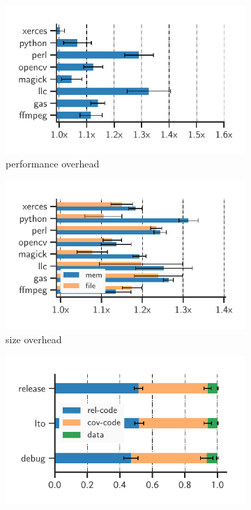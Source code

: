 \begin{figure}[t!]
	\centering
	\small
	\begin{subfigure}[t]{0.29\textwidth}
		\includegraphics[clip, trim=0.48cm 0.4cm 1.4cm 0.65cm, width=\textwidth]{fig/perf-overhead}
		\caption{performance overhead}
		\label{fig:performance-overhead}
	\end{subfigure}
	\hspace{10pt}
	\begin{subfigure}[t]{0.29\textwidth}
		\includegraphics[clip, trim=0.47cm 0.42cm 1.65cm 0.65cm, width=\textwidth]{fig/any-overhead}
		\caption{size overhead}
		\label{fig:size-overhead}
	\end{subfigure}
	\hspace{10pt}
	\begin{subfigure}[t]{0.3\textwidth}
		\includegraphics[clip, trim=0.48cm 0.36cm 0.75cm 0.65cm, width=\textwidth]{fig/overhead-dist}

\end{subfigure}
\end{figure}
